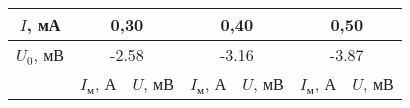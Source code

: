\documentclass[a4paper,12pt]{article} %
\begin{document}
\begin{table}[h]
	\centering
	\begin{tabular}{l|cc|cc|cc|}
		\hline
		\multicolumn{1}{|c|}{$I$, мА}   & \multicolumn{2}{c|}{0,30} & 
            \multicolumn{2}{c|}{0,40} & \multicolumn{2}{c|}{0,50} \\ \hline
		\multicolumn{1}{|c|}{$U_0$, мВ} & \multicolumn{2}{c|}{-2.58} & 
            \multicolumn{2}{c|}{-3.16} & \multicolumn{2}{c|}{-3.87} \\ \hline
		\multicolumn{1}{c|}{} & \multicolumn{1}{c|}{$I_\text{м}$, А} & 
            $U$, мВ & \multicolumn{1}{c|}{$I_\text{м}$, А} & $U$, мВ &
            
            \multicolumn{1}{c|}{$I_\text{м}$, А} & $U$, мВ \\ \cline{2-7}
            

\end{tabular}
\end{table}
\end{document}
